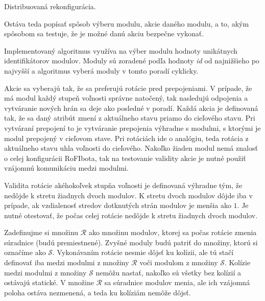 \documentclass[
  printed, %
  oneside, %
  notable,   %
  nolof,     %
  nolot,     %
]{fithesis3}
\begin{document}
\begin{algorithm}
    \caption{Distribuovaná rekonfigurácia. }
    \label{algorithm:algo2}
    
    \DontPrintSemicolon
    
\end{algorithm}

Ostáva teda popísať spôsob výberu modulu, akcie daného modulu, a to, akým spôsobom sa testuje, že je možné danú akciu bezpečne vykonať. 

Implementovaný algoritmus využíva na výber modulu hodnoty unikátnych identifikátorov modulov. Moduly sú zoradené podľa hodnoty \textit{id} od najnižšieho po najvyšší a algoritmus vyberá moduly v tomto poradí cyklicky. 

Akcie sa vyberajú tak, že sa preferujú rotácie pred prepojeniami. V prípade, že má modul každý stupeň voľnosti správne natočený, tak nasledujú odpojenia a vytváranie nových hrán sa deje ako posledné v poradí. Každá akcia je definovaná tak, že sa daný atribút zmení z aktuálneho stavu priamo do cieľového stavu. Pri vytváraní prepojení to je vytváranie prepojenia výhradne s modulmi, s ktorými je modul prepojený v cieľovom stave. Pri rotáciách ide o analógiu, teda rotácia z aktuálneho stavu uhla voľnosti do cieľového. Nakoľko žiaden modul nemá znalosť o celej konfigurácii RoFIbota, tak na testovanie validity akcie je nutné použiť vzájomnú komunikáciu medzi modulmi. 

Validita rotácie akéhokoľvek stupňa voľnosti je definovaná výhradne tým, že nedôjde k stretu žiadnych dvoch modulov. K stretu dvoch modulov dôjde iba v prípade, ak vzdialenosť stredov dotknutých strán modulov je menšia ako $1$. Je nutné otestovať, že počas celej rotácie nedôjde k stretu žiadnych dvoch modulov. 

Zadefinujme si množinu $\mathcal{R}$ ako množinu modulov, ktorej sa počas rotácie zmenia súradnice (budú premiestnené). Zvyšné moduly budú patriť do množiny, ktorú si označíme ako $\mathcal{S}$. Vykonávaním rotácie nesmie dôjsť ku kolízii, ale tú stačí definovať iba medzi modulmi z množiny $\mathcal{R}$ voči modulom z množiny $\mathcal{S}$. Kolízie medzi modulmi z množiny $\mathcal{S}$ nemôžu nastať, nakoľko sú všetky bez kolízií a ostávajú statické. V množine $\mathcal{R}$ sa súradnice modulov menia, ale ich vzájomná poloha ostáva nezmenená, a teda ku kolíziám nemôže dôjsť. 
\end{document}

